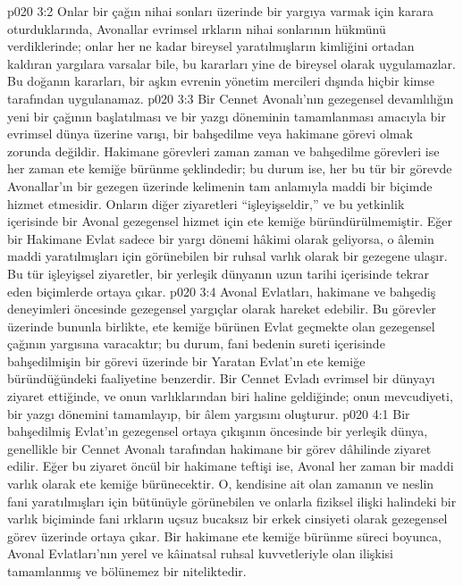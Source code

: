 \vs p020 3:2 Onlar bir çağın nihai sonları üzerinde bir yargıya varmak için karara oturduklarında, Avonallar evrimsel ırkların nihai sonlarının hükmünü verdiklerinde; onlar her ne kadar bireysel yaratılmışların kimliğini ortadan kaldıran yargılara varsalar bile, bu kararları yine de bireysel olarak uygulamazlar. Bu doğanın kararları, bir aşkın evrenin yönetim mercileri dışında hiçbir kimse tarafından uygulanamaz.
\vs p020 3:3 Bir Cennet Avonalı’nın gezegensel devamlılığın yeni bir çağının başlatılması ve bir yazgı döneminin tamamlanması amacıyla bir evrimsel dünya üzerine varışı, bir bahşedilme veya hakimane görevi olmak zorunda değildir. Hakimane görevleri zaman zaman ve bahşedilme görevleri ise her zaman ete kemiğe bürünme şeklindedir; bu durum ise, her bu tür bir görevde Avonallar’ın bir gezegen üzerinde kelimenin tam anlamıyla maddi bir biçimde hizmet etmesidir. Onların diğer ziyaretleri “işleyişseldir,” ve bu yetkinlik içerisinde bir Avonal gezegensel hizmet için ete kemiğe büründürülmemiştir. Eğer bir Hakimane Evlat sadece bir yargı dönemi hâkimi olarak geliyorsa, o âlemin maddi yaratılmışları için görünebilen bir ruhsal varlık olarak bir gezegene ulaşır. Bu tür işleyişsel ziyaretler, bir yerleşik dünyanın uzun tarihi içerisinde tekrar eden biçimlerde ortaya çıkar.
\vs p020 3:4 Avonal Evlatları, hakimane ve bahşediş deneyimleri öncesinde gezegensel yargıçlar olarak hareket edebilir. Bu görevler üzerinde bununla birlikte, ete kemiğe bürünen Evlat geçmekte olan gezegensel çağının yargısına varacaktır; bu durum, fani bedenin sureti içerisinde bahşedilmişin bir görevi üzerinde bir Yaratan Evlat’ın ete kemiğe büründüğündeki faaliyetine benzerdir. Bir Cennet Evladı evrimsel bir dünyayı ziyaret ettiğinde, ve onun varlıklarından biri haline geldiğinde; onun mevcudiyeti, bir yazgı dönemini tamamlayıp, bir âlem yargısını oluşturur.
\vs p020 4:1 Bir bahşedilmiş Evlat’ın gezegensel ortaya çıkışının öncesinde bir yerleşik dünya, genellikle bir Cennet Avonalı tarafından hakimane bir görev dâhilinde ziyaret edilir. Eğer bu ziyaret öncül bir hakimane teftişi ise, Avonal her zaman bir maddi varlık olarak ete kemiğe bürünecektir. O, kendisine ait olan zamanın ve neslin fani yaratılmışları için bütünüyle görünebilen ve onlarla fiziksel ilişki halindeki bir varlık biçiminde fani ırkların uçsuz bucaksız bir erkek cinsiyeti olarak gezegensel görev üzerinde ortaya çıkar. Bir hakimane ete kemiğe bürünme süreci boyunca, Avonal Evlatları’nın yerel ve kâinatsal ruhsal kuvvetleriyle olan ilişkisi tamamlanmış ve bölünemez bir niteliktedir.
